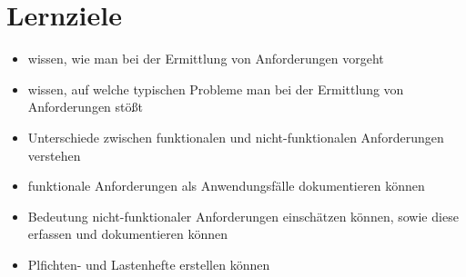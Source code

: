 \section{Lernziele}
\begin{itemize}
    \item wissen, wie man bei der Ermittlung von Anforderungen vorgeht
    \item wissen, auf welche typischen Probleme man bei der Ermittlung von Anforderungen stößt
    \item Unterschiede zwischen funktionalen und nicht-funktionalen Anforderungen verstehen
    \item funktionale Anforderungen als Anwendungsfälle dokumentieren können
    \item Bedeutung nicht-funktionaler Anforderungen einschätzen können, sowie diese erfassen und dokumentieren können
    \item Plfichten- und Lastenhefte erstellen können
\end{itemize}